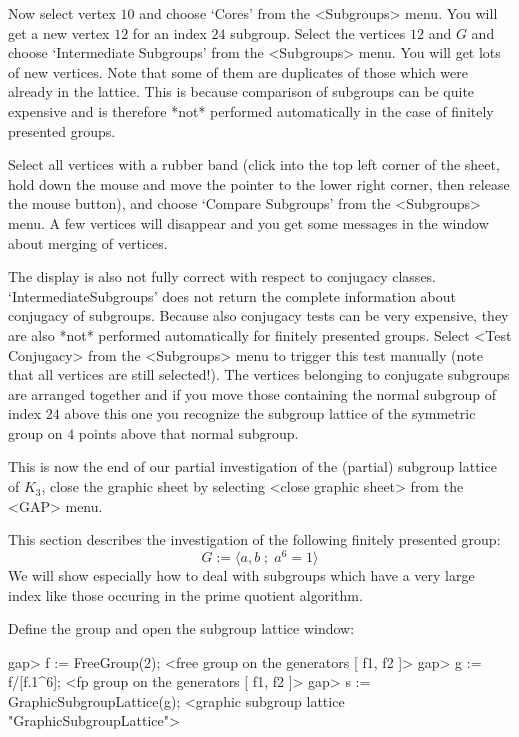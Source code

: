 Now select vertex $10$ and choose `Cores' from the <Subgroups> menu.
You will get a new vertex $12$ for  an index $24$ subgroup. Select the
vertices $12$   and $G$ and choose  `Intermediate  Subgroups' from the
<Subgroups> menu. You will get lots  of new vertices. Note that some
of them  are duplicates of  those which  were already  in the lattice. 
This is because comparison of subgroups can  be quite expensive and is
therefore   *not* performed automatically    in  the case of  finitely
presented groups.

Select all vertices with a rubber band (click into the top left corner
of  the sheet, hold down  the mouse and  move the pointer to the lower
right corner, then  release  the mouse  button), and   choose 
`Compare Subgroups' from the <Subgroups> menu.  A few vertices will disappear
and  you get  some  messages in  the {\GAP}  window   about merging of
vertices.

The  display   is also  not  fully correct  with  respect to conjugacy
classes.    `IntermediateSubgroups'    does  not  return  the complete
information about conjugacy of subgroups. Because also conjugacy tests
can be very expensive, they are also *not* performed automatically for
finitely   presented   groups.  Select    <Test  Conjugacy>  from  the
<Subgroups>  menu to  trigger  this  test  manually (note  that  all
vertices are still selected!).   The vertices belonging  to  conjugate
subgroups are  arranged together and  if you move those containing the
normal subgroup  of index $24$    above this  one you  recognize   the
subgroup lattice   of the symmetric  group on   $4$ points above  that
normal subgroup.

This is  now  the end  of our partial   investigation of the (partial)
subgroup lattice of $K_3$, close the graphic sheet by selecting <close
graphic sheet> from the <GAP> menu.



This section describes the investigation of the following finitely presented
group: 
$$ G := \langle a, b \; ; \; a^6 = 1 \rangle $$
We will show especially how to deal with subgroups which have a very large
index like those occuring in the prime quotient algorithm.

Define the group and open the subgroup lattice window:

\begintt
gap> f := FreeGroup(2);
<free group on the generators [ f1, f2 ]>
gap> g := f/[f.1^6];
<fp group on the generators [ f1, f2 ]>
gap> s := GraphicSubgroupLattice(g);
<graphic subgroup lattice "GraphicSubgroupLattice">
\endtt

